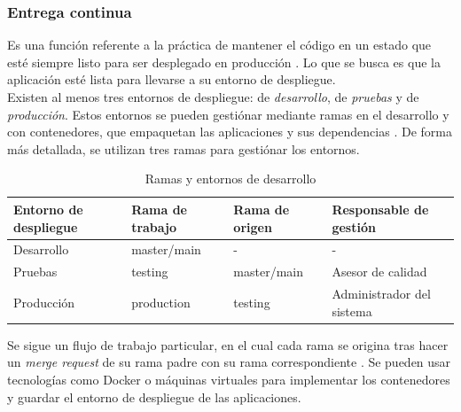 \documentclass[runningheads]{llncs}
\begin{document}
\subsubsection{Entrega continua}
Es una función referente a la práctica de mantener el código en un estado que esté siempre listo para ser desplegado
en producción \cite{fairbanks2023analyzing}. Lo que se busca es que la aplicación esté lista para llevarse a su entorno
de despliegue.\\
Existen al menos tres entornos de despliegue: de \textit{desarrollo}, de \textit{pruebas} y de \textit{producción}.
Estos entornos se pueden gestiónar mediante ramas en el desarrollo y con contenedores, que empaquetan las aplicaciones
y sus dependencias \cite{fairbanks2023analyzing}. De forma más detallada, se utilizan tres ramas para
gestiónar los entornos.
\begin{table}
        \centering
        \caption{Ramas y entornos de desarrollo}
        \label{table:2}
        \begin{tabularx}{0.9\textwidth}{X | X | X | X}
                \textbf{Entorno de despliegue} & \textbf{Rama de trabajo}
                & \textbf{Rama de origen} & \textbf{Responsable de gestión}\\
                \hline
                Desarrollo & master/main & - & - \\
                Pruebas & testing & master/main & Asesor de calidad \\
                Producción & production & testing & Administrador del sistema\\
                \hline
        \end{tabularx}
\end{table}
Se sigue un flujo de trabajo particular, en el cual cada rama se origina tras hacer un \textit{merge request}
de su rama padre con su rama correspondiente \cite{alvin2023devops}. Se pueden usar tecnologías como Docker 
o máquinas virtuales para implementar los contenedores y guardar el entorno de despliegue de las aplicaciones.
\end{document}
